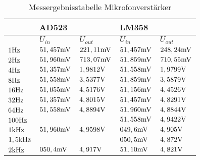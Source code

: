 \begin{table}[H]
\centering
\caption{Messergebnisstabelle Mikrofonverstärker}
\label{tab:Mikrofon_erg_tab}
\begin{tabular}{l||l|l||l|l|}
\cline{2-5}
                                                & \multicolumn{2}{l||}{AD523} & \multicolumn{2}{l|}{LM358} \\ \hline
\rowcolor[HTML]{C0C0C0} 
\multicolumn{1}{|l||}{\cellcolor[HTML]{C0C0C0}$f$} &$ U_{in}       $&$ U_{out}     $&$ U_{in}       $&$ U_{out}  $\\ \hline
\multicolumn{1}{|l||}{$1\text{Hz}$}                         &$ 51,457\text{mV}    $&$ 221,11\text{mV}   $&$ 51,457\text{mV}   $&$ 248,24\text{mV}    $\\ \hline
\multicolumn{1}{|l||}{$2\text{Hz}$}                         &$ 51,960\text{mV}    $&$ 713,07\text{mV}   $&$ 51,859\text{mV}   $&$ 710,55\text{mV}    $\\ \hline
\multicolumn{1}{|l||}{$4\text{Hz}$}                         &$ 51,357\text{mV}    $&$ 1,9812\text{V}      $&$ 51,558\text{mV}   $&$ 1,9799\text{V}       $\\ \hline
\multicolumn{1}{|l||}{$8\text{Hz}$}                         &$ 51,558\text{mV}    $&$ 3,5377\text{V}      $&$ 51,859\text{mV}   $&$ 3,5879\text{V}       $\\ \hline
\multicolumn{1}{|l||}{$16\text{Hz}$}                        &$ 51,055\text{mV}    $&$ 4,5176\text{V}      $&$ 51,156\text{mV}   $&$ 4,4526\text{V}       $\\ \hline
\multicolumn{1}{|l||}{$32\text{Hz}$}                        &$ 51,357\text{mV}    $&$ 4,8015\text{V}      $&$ 51,457\text{mV}   $&$ 4,8291\text{V}       $\\ \hline
\multicolumn{1}{|l||}{$64\text{Hz}$}                        &$ 51,558\text{mV}    $&$ 4,8894\text{V}      $&$ 51,960\text{mV}   $&$ 4,8844\text{V}       $\\ \hline
\multicolumn{1}{|l||}{$100\text{Hz}$}                       &$              $&$             $&$ 51,558\text{mV}   $&$ 4,9422\text{V}       $\\ \hline
\multicolumn{1}{|l||}{$1\text{kHz}$}                       &$ 51,960\text{mV}    $&$ 4,9598\text{V}      $&$ 049,6\text{mV}    $&$ 4,905\text{V}        $\\ \hline
\multicolumn{1}{|l||}{$1,5\text{kHz}$}                     &$              $&$             $&$ 050,5\text{mV}    $&$ 4,872\text{V}        $\\ \hline
\multicolumn{1}{|l||}{$2\text{kHz}$}                       &$ 050,4\text{mV}     $&$ 4,917\text{V}       $&$ 51,10\text{mV}    $&$ 4,821\text{V}        $\\ \hline

\end{tabular}
\end{table}
